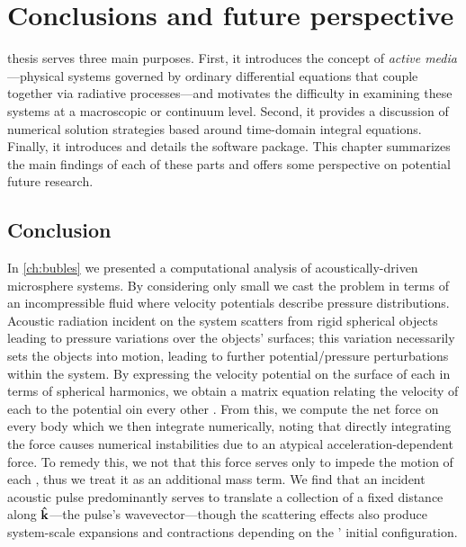 \chapter{\label{ch:conclusions}Conclusions and future perspective}

 thesis serves three main purposes.
First, it introduces the concept of \emph{active media}---physical systems governed by ordinary differential equations that couple together via radiative processes---and motivates the difficulty in examining these systems at a macroscopic or continuum level.
Second, it provides a discussion of numerical solution strategies based around time-domain integral equations.
Finally, it introduces and details the \QuEST{} software package.
This chapter summarizes the main findings of each of these parts and offers some perspective on potential future research. 

\section{Conclusion}

In \cref{ch:bubles} we presented a computational analysis of acoustically-driven microsphere systems.
By considering only small \bubbles{} we cast the problem in terms of an incompressible fluid where velocity potentials describe pressure distributions.
Acoustic radiation incident on the system scatters from rigid spherical objects leading to pressure variations over the objects' surfaces; this variation necessarily sets the objects into motion, leading to further potential/pressure perturbations within the system.
By expressing the velocity potential on the surface of each \bubble{} in terms of spherical harmonics, we obtain a matrix equation relating the velocity of each \bubble{} to the potential oin every other \bubble{}.
From this, we compute the net force on every body which we then integrate numerically, noting that directly integrating the force causes numerical instabilities due to an atypical acceleration-dependent force.
To remedy this, we not that this force serves only to impede the motion of each \bubble{}, thus we treat it as an additional mass term.
We find that an incident acoustic pulse predominantly serves to translate a collection of \bubbles{} a fixed distance along $\vu{k}$---the pulse's wavevector---though the scattering effects also produce system-scale expansions and contractions depending on the \bubbles' initial configuration.

